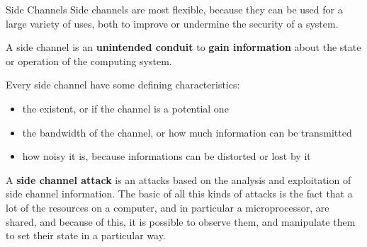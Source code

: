 \begin{section}{Side Channels}
  Side channels are most flexible, because they can be used for a large variety of uses, both to
  improve or undermine the security of a system.\\
  \begin{boxH}
    A side channel is an \textbf{unintended conduit} to \textbf{gain information} about the state or
    operation of the computing system.
  \end{boxH}
  Every side channel have some defining characteristics:
  \begin{itemize}
    \item the existent, or if the channel is a potential one
    \item the bandwidth of the channel, or how much information can be transmitted
    \item how noisy it is, because informations can be distorted or lost by it
  \end{itemize}
  A \textbf{side channel attack} is an attacks based on the analysis and exploitation of side channel
  information. The basic of all this kinds of attacks is the fact that a lot of the resources on a
  computer, and in particular a microprocessor, are shared, and because of this, it is possible to
  observe them, and manipulate them to set their state in a particular way.\\


\end{section}
